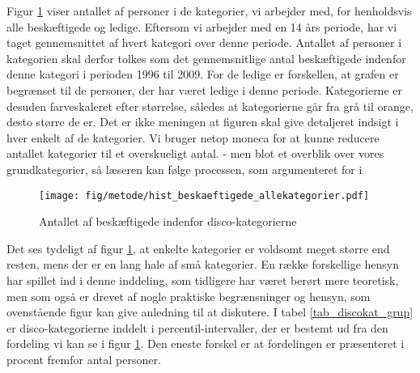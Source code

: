 Figur \ref{fig_hist_beskaeftigede_allekategorier} viser antallet af personer i de \antalkat kategorier, vi arbejder med, for henholdsvis alle beskæftigede og ledige. Eftersom vi arbejder med en 14 års periode, har vi taget gennemsnittet af hvert kategori over denne periode. Antallet af personer i kategorien skal derfor tolkes som det gennemsnitlige antal beskæftigede indenfor denne kategori i perioden 1996 til 2009. For de ledige er forskellen, at grafen er begrænset til de personer, der har været ledige i denne periode. Kategorierne er desuden farveskaleret efter størrelse, således at kategorierne går fra grå til orange, desto større de er. Det er ikke meningen at figuren skal give detaljeret indsigt i hver enkelt af de \antalkat kategorier. Vi bruger netop moneca for at kunne reducere antallet kategorier til et overskueligt antal. - men blot et overblik over vores grundkategorier, så læseren kan følge processen, som argumenteret for i %



\begin{figure}[h]
\begin{centering}
	\caption{Antallet af beskæftigede indenfor disco-kategorierne}
	\texttt{[image: fig/metode/hist\_beskaeftigede\_allekategorier.pdf]}
	\label{fig_hist_beskaeftigede_allekategorier}
\end{centering}
\end{figure}

Det ses tydeligt af figur \ref{fig_hist_beskaeftigede_allekategorier}, at enkelte kategorier er voldsomt meget større end resten, mens der er en lang hale af små kategorier. En række forskellige hensyn har spillet ind i denne inddeling, som tidligere har været berørt mere teoretisk, men som også er drevet af nogle praktiske begrænsninger og hensyn, som ovenstående figur kan give anledning til at diskutere. I tabel \ref{tab_discokat_grup} er disco-kategorierne inddelt i percentil-intervaller, der er bestemt ud fra den fordeling vi kan se i figur \ref{fig_hist_beskaeftigede_allekategorier}. Den eneste forskel er at fordelingen er præsenteret i procent fremfor antal personer. %

